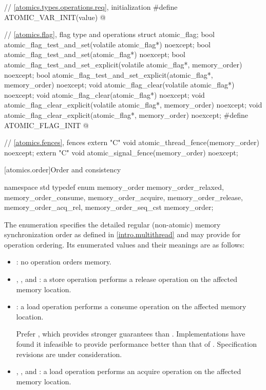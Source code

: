 \begin{codeblock}
{  // \ref{atomics.types.operations.req}, initialization
  #define ATOMIC_VAR_INIT(value) @\seebelow@

  // \ref{atomics.flag}, flag type and operations
  struct atomic_flag;
  bool atomic_flag_test_and_set(volatile atomic_flag*) noexcept;
  bool atomic_flag_test_and_set(atomic_flag*) noexcept;
  bool atomic_flag_test_and_set_explicit(volatile atomic_flag*, memory_order) noexcept;
  bool atomic_flag_test_and_set_explicit(atomic_flag*, memory_order) noexcept;
  void atomic_flag_clear(volatile atomic_flag*) noexcept;
  void atomic_flag_clear(atomic_flag*) noexcept;
  void atomic_flag_clear_explicit(volatile atomic_flag*, memory_order) noexcept;
  void atomic_flag_clear_explicit(atomic_flag*, memory_order) noexcept;
  #define ATOMIC_FLAG_INIT @\seebelow@

  // \ref{atomics.fences}, fences
  extern "C" void atomic_thread_fence(memory_order) noexcept;
  extern "C" void atomic_signal_fence(memory_order) noexcept;
}
\end{codeblock}

[atomics.order]{Order and consistency}

\begin{codeblock}
namespace std {
  typedef enum memory_order {
    memory_order_relaxed, memory_order_consume, memory_order_acquire, 
    memory_order_release, memory_order_acq_rel, memory_order_seq_cst
  } memory_order;
}
\end{codeblock}

\pnum
The enumeration  specifies the detailed regular
(non-atomic) memory synchronization order as defined in
\ref{intro.multithread} and may provide for operation ordering. Its
enumerated values and their meanings are as follows:

\begin{itemize}
\item {}: no operation orders memory.

\item {}, , and
: a store operation performs a release operation on the
affected memory location.

\item {}: a load operation performs a consume operation on the
affected memory location.
\begin{note} Prefer , which provides stronger guarantees
than . Implementations have found it infeasible
to provide performance better than that of .
Specification revisions are under consideration. \end{note}

\item {}, , and
: a load operation performs an acquire operation on the
affected memory location.
\end{itemize}

